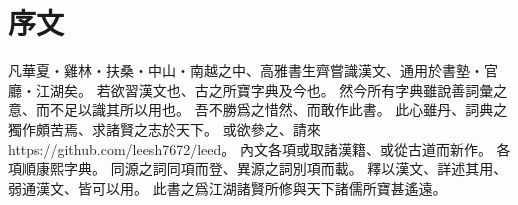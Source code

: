 \chapter*{序文}
凡華夏・雞林・扶桑・中山・南越之中、高雅書生齊嘗識漢文、通用於書塾・官廳・江湖矣。
若欲習漢文也、古之所寶字典及今也。
然今所有字典雖說善詞彙之意、而不足以識其所以用也。
吾不勝爲之惜然、而敢作此書。
此心雖丹、詞典之獨作頗苦焉、求諸賢之志於天下。
或欲參之、請來 https://github.com/leesh7672/leed。
內文各項或取諸漢籍、或從古道而新作。
各項順康熙字典。
同源之詞同項而登、異源之詞別項而載。
釋以漢文、詳述其用、弱通漢文、皆可以用。
此書之爲江湖諸賢所修與天下諸儒所寶甚遙遠。
